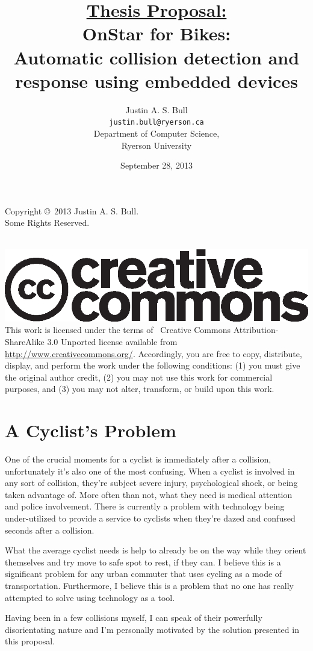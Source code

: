 \documentclass[titlepage]{article}
\title{\underline{Thesis Proposal:}\\
	\vspace{12pt}
	OnStar for Bikes:\\
	Automatic collision detection and response using embedded devices}
\author{Justin A. S. Bull\\
	\texttt{justin.bull@ryerson.ca}\\
	Department of Computer Science,\\
	Ryerson University\\}
\date{September 28, 2013\\
	\vspace{36pt}
	{\Huge \ccbysa}}
\begin{document}
\maketitle

\null
\vfill
\noindent
Copyright \copyright\ 2013 Justin A. S. Bull.\\
Some Rights Reserved.

\noindent
\\
\includegraphics*[scale=0.5]{cclogo.eps}
\\

\noindent
This work is licensed under the terms of \ccbysa\ Creative Commons
Attribution-ShareAlike 3.0 Unported license available from
\url{http://www.creativecommons.org/}. Accordingly, you are free to copy, distribute,
display, and perform the work under the following conditions: (1) you must give the
original author credit, (2) you may not use this work for commercial purposes, and
(3) you may not alter, transform, or build upon this work.

\clearpage

\section{A Cyclist's Problem}
One of the crucial moments for a cyclist is immediately after a collision, unfortunately it's also one of the most confusing. When a cyclist is involved in any sort of collision, they're subject severe injury, psychological shock, or being taken advantage of. More often than not, what they need is medical attention and police involvement. There is currently a problem with technology being under-utilized to provide a service to cyclists when they're dazed and confused seconds after a collision.

What the average cyclist needs is help to already be on the way while they orient themselves and try move to safe spot to rest, if they can. I believe this is a significant problem for any urban commuter that uses cycling as a mode of transportation. Furthermore, I believe this is a problem that no one has really attempted to solve using technology as a tool.

Having been in a few collisions myself, I can speak of their powerfully disorientating nature and I'm personally motivated by the solution presented in this proposal.
\end{document}
